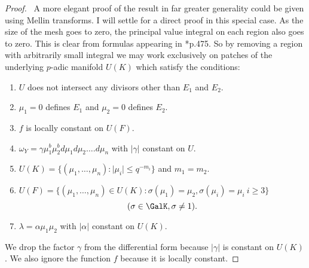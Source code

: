 \documentclass{memo-l}
\theoremstyle{definition}
\theoremstyle{remark}
\numberwithin{section}{chapter}
\numberwithin{equation}{chapter}
\begin{document}
\begin{proof} \ A more elegant proof of the result in far greater
generality could be given using Mellin transforms.  I will settle for a
direct proof in this special case.  As the size of the mesh goes to zero,
the principal value integral on each region also goes to zero.  This is
clear from formulas appearing in \cite{MR701566}*{p.475}.  So by removing a
region with arbitrarily small integral we may work exclusively on patches
of the underlying $p$-adic manifold $U(K)$ which satisfy the conditions:
\begin{enumerate}[label=\roman*)]
\item $U$ does not intersect any divisors other than $E_{1}$ and $E_{2}$.
\item ${\mu}_{1} = 0$ defines $E_{1}$ and ${\mu}_{2} = 0$ defines $E_{2}$.
\item $f$ is locally constant on $U(F)$.
\item ${\omega}_{Y} =
{\gamma}{\mu}_{1}^{b}{\mu}_{2}^{b}d{\mu}_{1}d{\mu}_{2}\ldots .d{\mu}_{n}$
with $\vert {\gamma}\vert$ constant on $U$.
\item $U(K) = \{({\mu}_{1},\ldots ,{\mu}_{n}): \vert {\mu}_{i}\vert \le
q^{-m_{i}} \}$ and $m_{1} = m_{2}$.
\item $U(F) = \{({\mu}_{1},\ldots ,{\mu}_{n}) \in U(K) :
{\sigma}({\mu}_{1}) = {\mu}_{2}, {\sigma}({\mu}_{i}) = {\mu}_{i} \ i \ge 3\} $
$$({\sigma} \in \GalK, {\sigma}\ne 1).$$
\item ${\lambda} = {\alpha}{\mu}_{1}{\mu}_{2}$ with $\vert {\alpha}\vert$
constant on $U(K)$.
\end{enumerate}

\medpagebreak

   We drop the factor ${\gamma}$ from the differential form because $\vert
{\gamma}\vert$ is constant on $U(K)$.  We also ignore the function $f$
because it is locally constant.



\end{proof}
\end{document}
